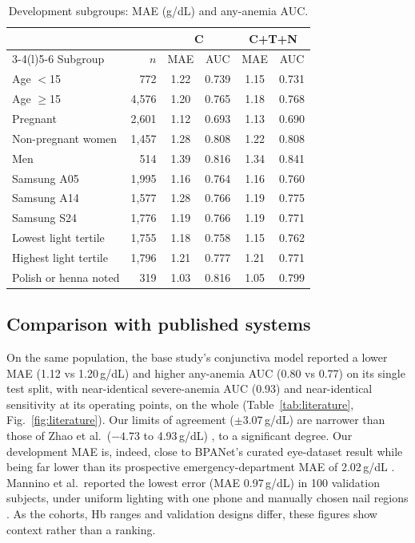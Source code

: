 \documentclass[10pt,a4paper,twocolumn]{article}
\newcommand{\gdl}{\,g/dL}
\begin{document}
\begin{table}[t]
\centering\small
\caption{Development subgroups: MAE (g/dL) and any-anemia AUC.}
\label{tab:subgroups}
\setlength{\tabcolsep}{3.5pt}
\begin{tabularx}{\columnwidth}{@{}Xrcccc@{}}
\toprule
 & & \multicolumn{2}{c}{C} & \multicolumn{2}{c}{C+T+N} \\
\cmidrule(lr){3-4}\cmidrule(l){5-6}
Subgroup & $n$ & MAE & AUC & MAE & AUC \\
\midrule
Age $<$15 & 772 & 1.22 & 0.739 & 1.15 & 0.731 \\
Age $\ge$15 & 4,576 & 1.20 & 0.765 & 1.18 & 0.768 \\
Pregnant & 2,601 & 1.12 & 0.693 & 1.13 & 0.690 \\
Non-pregnant women & 1,457 & 1.28 & 0.808 & 1.22 & 0.808 \\
Men & 514 & 1.39 & 0.816 & 1.34 & 0.841 \\
Samsung A05 & 1,995 & 1.16 & 0.764 & 1.16 & 0.760 \\
Samsung A14 & 1,577 & 1.28 & 0.766 & 1.19 & 0.775 \\
Samsung S24 & 1,776 & 1.19 & 0.766 & 1.19 & 0.771 \\
Lowest light tertile & 1,755 & 1.18 & 0.758 & 1.15 & 0.762 \\
Highest light tertile & 1,796 & 1.21 & 0.777 & 1.21 & 0.771 \\
Polish or henna noted & 319 & 1.03 & 0.816 & 1.05 & 0.799 \\
\bottomrule
\end{tabularx}
\end{table}

\subsection{Comparison with published systems}
On the same population, the base study's conjunctiva model reported a lower MAE (1.12 vs 1.20\gdl) and higher any-anemia AUC (0.80 vs 0.77) on its single test split, with near-identical severe-anemia AUC (0.93) and near-identical sensitivity at its operating points, on the whole \cite{desai2026} (Table~\ref{tab:literature}, Fig.~\ref{fig:literature}). Our limits of agreement ($\pm3.07$\gdl) are narrower than those of Zhao et al.\ ($-4.73$ to 4.93\gdl) \cite{zhao2024}, to a significant degree. Our development MAE is, indeed, close to BPANet's curated eye-dataset result while being far lower than its prospective emergency-department MAE of 2.02\gdl{} \cite{lin2025}. Mannino et al.\ reported the lowest error (MAE 0.97\gdl) in 100 validation subjects, under uniform lighting with one phone and manually chosen nail regions \cite{mannino2018}. As the cohorts, Hb ranges and validation designs differ, these figures show context rather than a ranking.
\end{document}
